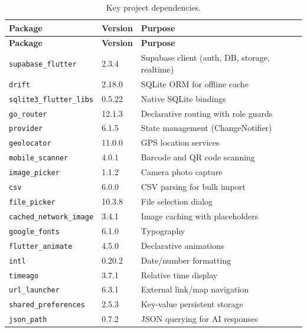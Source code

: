 \begin{small}
\begin{longtable}{@{}llp{7cm}@{}}
\caption{Key project dependencies.}
\label{tab:deps}\\
\toprule
\textbf{Package} & \textbf{Version} & \textbf{Purpose}\\
\midrule
\endfirsthead
\toprule
\textbf{Package} & \textbf{Version} & \textbf{Purpose}\\
\midrule
\endhead
\bottomrule
\endlastfoot

\texttt{supabase\_flutter}    & 2.3.4  & Supabase client (auth, DB, storage, realtime) \\
\texttt{drift}                & 2.18.0 & SQLite ORM for offline cache \\
\texttt{sqlite3\_flutter\_libs} & 0.5.22 & Native SQLite bindings \\
\texttt{go\_router}           & 12.1.3 & Declarative routing with role guards \\
\texttt{provider}             & 6.1.5  & State management (ChangeNotifier) \\
\texttt{geolocator}           & 11.0.0 & GPS location services \\
\texttt{mobile\_scanner}      & 4.0.1  & Barcode and QR code scanning \\
\texttt{image\_picker}        & 1.1.2  & Camera photo capture \\
\texttt{csv}                  & 6.0.0  & CSV parsing for bulk import \\
\texttt{file\_picker}         & 10.3.8 & File selection dialog \\
\texttt{cached\_network\_image} & 3.4.1 & Image caching with placeholders \\
\texttt{google\_fonts}        & 6.1.0  & Typography \\
\texttt{flutter\_animate}     & 4.5.0  & Declarative animations \\
\texttt{intl}                 & 0.20.2 & Date/number formatting \\
\texttt{timeago}              & 3.7.1  & Relative time display \\
\texttt{url\_launcher}        & 6.3.1  & External link/map navigation \\
\texttt{shared\_preferences}  & 2.5.3  & Key-value persistent storage \\
\texttt{json\_path}           & 0.7.2  & JSON querying for AI responses \\
\end{longtable}
\end{small}

